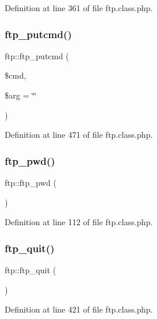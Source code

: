 Definition at line 361 of file ftp.\+class.\+php.

\mbox{\label{classftp_a77dcfe6900e85bbd3c22308123905eee}} 
\subsubsection{\texorpdfstring{ftp\+\_\+putcmd()}{ftp\_putcmd()}}
{\footnotesize\ttfamily ftp\+::ftp\+\_\+putcmd (\begin{DoxyParamCaption}\item[{}]{\$cmd,  }\item[{}]{\$arg = {\ttfamily \char`\"{}\char`\"{}} }\end{DoxyParamCaption})}



Definition at line 471 of file ftp.\+class.\+php.

\mbox{\label{classftp_ab4e7d0619162897f11fe1d53b2edf477}} 
\subsubsection{\texorpdfstring{ftp\+\_\+pwd()}{ftp\_pwd()}}
{\footnotesize\ttfamily ftp\+::ftp\+\_\+pwd (\begin{DoxyParamCaption}{ }\end{DoxyParamCaption})}



Definition at line 112 of file ftp.\+class.\+php.

\mbox{\label{classftp_a993db0725e312a4c202d6b1c84780df3}} 
\subsubsection{\texorpdfstring{ftp\+\_\+quit()}{ftp\_quit()}}
{\footnotesize\ttfamily ftp\+::ftp\+\_\+quit (\begin{DoxyParamCaption}{ }\end{DoxyParamCaption})}



Definition at line 421 of file ftp.\+class.\+php.

